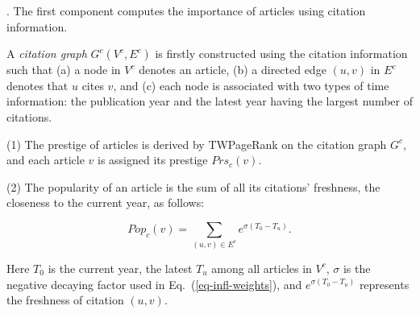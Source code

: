 









.
The first component computes the importance of articles using citation information.

A {\em citation graph} $G^c(V^c, E^c)$ is firstly constructed using the citation information such that (a) a node in $V^c$ denotes an article, (b) a directed edge $(u,v)$ in $E^c$ denotes that $u$ cites $v$, and (c) each node is associated with two types of time information: the publication year and the latest year having the largest number of citations.


\sstab(1) The prestige of articles is derived by TWPageRank on the citation graph $G^c$, and each article $v$ is assigned its prestige $Prs_c(v)$.

\sstab(2)  The popularity of an article is the sum of all its citations' freshness, \ie the closeness to the current year, as follows:
\begin{small}
\begin{equation}\label{eq-pop}
Pop_c(v) = \sum_{{(u,v)\in E^c}} {e^{\sigma (T_0-T_u)}}.
\end{equation}
\end{small}
\noindent
Here $T_0$ is the current year, \ie the latest $T_u$ among all articles in $V^c$, $\sigma$ is the negative decaying factor used in Eq.~(\ref{eq-infl-weights}), and $e^{\sigma (T_0-T_u)}$ represents the freshness of citation $(u,v)$.

